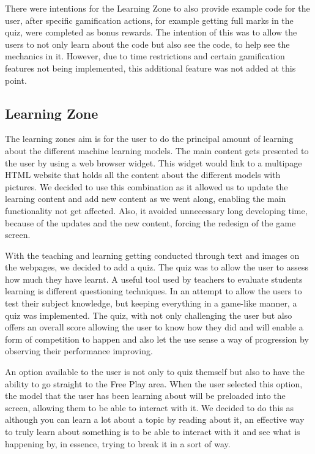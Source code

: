 		There were intentions for the Learning Zone to also provide example code for the user, after specific gamification actions, for example getting full marks in the quiz, were completed as bonus rewards. The intention of this was to allow the users to not only learn about the code but also see the code, to help see the mechanics in it. However, due to time restrictions and certain gamification features not being implemented, this additional feature was not added at this point.
	
	\subsection{Learning Zone}
	
	The learning zones aim is for the user to do the principal amount of learning about the different machine learning models. The main content gets presented to the user by using a web browser widget. This widget would link to a multipage HTML website that holds all the content about the different models with pictures. We decided to use this combination as it allowed us to update the learning content and add new content as we went along, enabling the main functionality not get affected. Also, it avoided unnecessary long developing time, because of the updates and the new content, forcing the redesign of the game screen. 
	
	With the teaching and learning getting conducted through text and images on the webpages, we decided to add a quiz. The quiz was to allow the user to assess how much they have learnt. A useful tool used by teachers to evaluate students learning is different questioning techniques. In an attempt to allow the users to test their subject knowledge, but keeping everything in a game-like manner, a quiz was implemented. The quiz, with not only challenging the user but also offers an overall score allowing the user to know how they did and will enable a form of competition to happen and also let the use sense a way of progression by observing their performance improving.
	
	An option available to the user is not only to quiz themself but also to have the ability to go straight to the Free Play area. When the user selected this option, the model that the user has been learning about will be preloaded into the screen, allowing them to be able to interact with it. We decided to do this as although you can learn a lot about a topic by reading about it, an effective way to truly learn about something is to be able to interact with it and see what is happening by, in essence, trying to break it in a sort of way.
	
